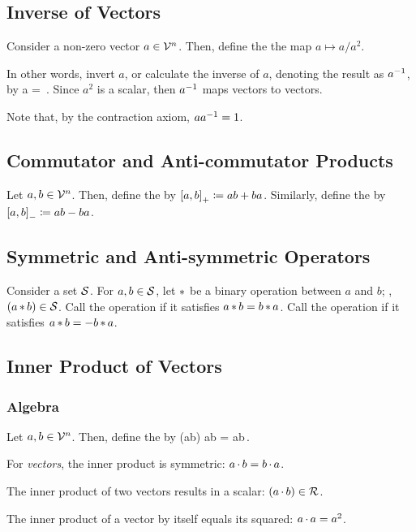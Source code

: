 \subsection{Inverse of Vectors}
Consider a non-zero vector $a\in\mathcal{V}^{n}$. Then, define the  the map $a\mapsto a/a^2$. 

In other words, invert $a$, or calculate the inverse of $a$, denoting the result as ${a}^{-1}$, by
\beq
\inv a =   {}\,.
\eeq
Since $a^2$ is a scalar, then ${a}^{-1}$ maps vectors to vectors.

Note that, by the contraction axiom, $a{a}^{-1} = 1$.


\subsection{Commutator and Anti-commutator Products}
Let $a,b\in\mathcal{V}^{n}$. Then, define the  by $\left[{a},{b}\right]_{+}\coloneqq{a}{b} + {b}{a}$. Similarly, define the  by $\left[{a},{b}\right]_{-}\coloneqq{a}{b} - {b}{a}$.


\subsection{Symmetric and Anti-symmetric Operators}
Consider a set $\mathcal{S}$. For $a, b\in\mathcal{S}$, let $\operatorname{\ast}$ be a binary operation between $a$ and $b$; \ie, $(a\operatorname{\ast} b)\in\mathcal{S}$. Call the operation  if it satisfies $a\operatorname{\ast} b = b\operatorname{\ast} a$. Call the operation  if it satisfies $a\operatorname{\ast} b = -b\operatorname{\ast} a$.


\subsection{Inner Product of Vectors}

\subsubsection{Algebra}
Let $a, b\in\mathcal{V}^{n}$. Then, define the  by
\left(a\iprod b\right)  \acom ab = \xacom ab\,.
\eeq

For \emph{vectors}, the inner product is symmetric: $a\operatorname{\cdot} b = b\operatorname{\cdot} a$.

The inner product of two vectors results in a scalar: $(a\operatorname{\cdot} b)\in\mathcal{R}$.

The inner product of a vector by itself equals its squared: $a\operatorname{\cdot} a = a^2$.

